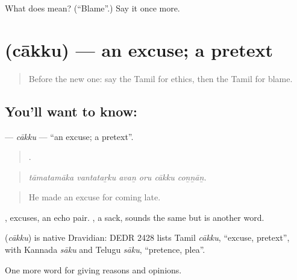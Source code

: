 \begin{tcolorbox}[breakable,colback=teal!4,colframe=teal!35!black,title={Before you move on}]
What does  mean? (\textquotedblleft{}Blame\textquotedblright{}.) Say it once more.
\end{tcolorbox}
\section[\texorpdfstring{\ta{சாக்கு} (cākku)}{சாக்கு (cākku)}]{ (cākku) — an excuse; a pretext}

\label{lesson:TA-C360-cakku}



\begin{quote}
Before the new one: say the Tamil for ethics, then the Tamil for blame.
\end{quote}

\subsection*{You'll want to know: }
\textbf{} — \emph{cākku} — \textquotedblleft{}an excuse; a pretext\textquotedblright{}.

\begin{quote}
     .
\end{quote}

\begin{quote}
\emph{tāmatamāka vantataṟku avaṉ oru cākku coṉṉāṉ.}
\end{quote}

\begin{quote}
He made an excuse for coming late.
\end{quote}

, excuses, an echo pair. , a sack, sounds the same but is another word.

\begin{cousinweb}
\textbf{} (\emph{cākku}) is native Dravidian: DEDR 2428 lists Tamil \emph{cākku}, \textquotedblleft{}excuse, pretext\textquotedblright{}, with Kannada \emph{sāku} and Telugu \emph{sāku}, \textquotedblleft{}pretence, plea\textquotedblright{}.
\end{cousinweb}

\begin{grammarlens}[title={What you've built}]
One more word for giving reasons and opinions.
\end{grammarlens}

